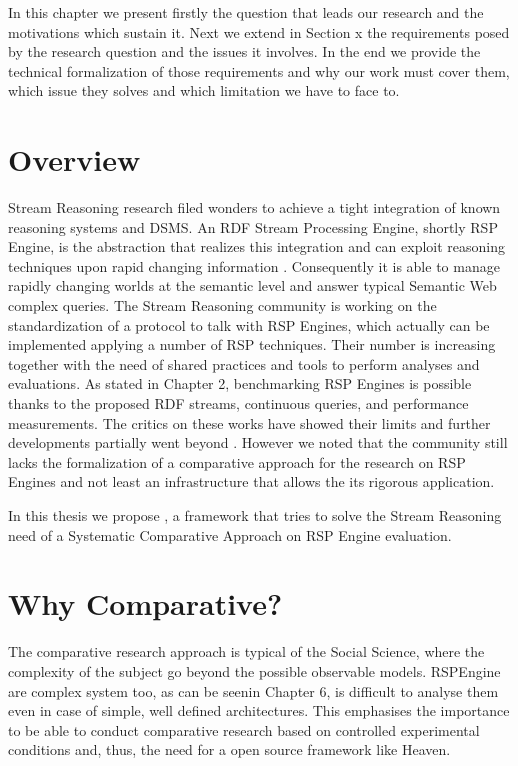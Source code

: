 In this chapter we present firstly the question that leads our research and the motivations which sustain it. Next we extend in Section x  the requirements posed by the research question and the issues it involves. In the end we provide the technical formalization of those requirements and why our work must cover them, which issue they solves and which limitation we have to face to.

\section{Overview}
Stream Reasoning research filed wonders to achieve a tight integration of known reasoning systems and DSMS. An RDF Stream Processing Engine, shortly RSP Engine, is the abstraction that realizes this integration and can exploit reasoning techniques upon rapid changing information \cite{Background SW, DSMS, SR}. Consequently it is able to  manage rapidly changing worlds at the semantic level and answer typical Semantic Web complex queries. The Stream Reasoning community is working on the standardization of a protocol to talk with RSP Engines, which actually can be implemented applying a number of RSP techniques. Their number is increasing together with the need of shared practices and tools to perform analyses and evaluations. As stated in Chapter 2, benchmarking RSP Engines is possible thanks to the proposed RDF streams, continuous queries, and performance measurements. The critics on these works have showed their limits and further developments partially went beyond \cite{paper paper}. However we noted that the community still lacks the formalization of a comparative approach for the research on RSP Engines and not least an infrastructure that allows the its rigorous application.

In this thesis we propose \namens, a framework that tries to solve the Stream Reasoning need of a Systematic Comparative Approach on RSP Engine evaluation.

\section{Why Comparative?}

The comparative research approach is typical of the Social Science, where the complexity of the subject go beyond the possible observable models. RSPEngine are complex system too, as can be seenin Chapter 6, is difficult to analyse them even in case of simple, well defined architectures. This emphasises the importance to be able to conduct comparative research based on controlled experimental conditions and, thus, the need for a open source framework like Heaven.

